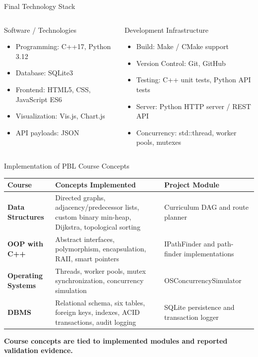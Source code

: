 \documentclass[aspectratio=169,11pt]{beamer}
\begin{document}
\begin{frame}{Final Technology Stack}
\begin{columns}[T,totalwidth=\textwidth]
\begin{block}{Software / Technologies}
\begin{itemize}\itemsep2pt
\item Programming: C++17, Python 3.12
\item Database: SQLite3
\item Frontend: HTML5, CSS, JavaScript ES6
\item Visualization: Vis.js, Chart.js
\item API payloads: JSON
\end{itemize}
\end{block}
\begin{block}{Development Infrastructure}
\begin{itemize}\itemsep2pt
\item Build: Make / CMake support
\item Version Control: Git, GitHub
\item Testing: C++ unit tests, Python API tests
\item Server: Python HTTP server / REST API
\item Concurrency: std::thread, worker pools, mutexes
\end{itemize}
\end{block}
\end{columns}
\end{frame}

\begin{frame}{Implementation of PBL Course Concepts}
\scriptsize
\begin{center}
\renewcommand{\arraystretch}{1.25}
\begin{tabularx}{.96\textwidth}{@{}>{\bfseries\RaggedRight}p{2.3cm} >{\RaggedRight\arraybackslash}X >{\RaggedRight}p{2.6cm}@{}}
\toprule
Course & Concepts Implemented & Project Module\\
\midrule
Data Structures & Directed graphs, adjacency/predecessor lists, custom binary min-heap, Dijkstra, topological sorting & Curriculum DAG and route planner\\
OOP with C++ & Abstract interfaces, polymorphism, encapsulation, RAII, smart pointers & IPathFinder and path-finder implementations\\
Operating Systems & Threads, worker pools, mutex synchronization, concurrency simulation & OSConcurrencySimulator\\
DBMS & Relational schema, six tables, foreign keys, indexes, ACID transactions, audit logging & SQLite persistence and transaction logger\\
\bottomrule
\end{tabularx}
\end{center}
\vfill
\begin{center}
\colorbox{GEULightBlue}{\parbox{.9\textwidth}{\centering\textbf{Course concepts are tied to implemented modules and reported validation evidence.}}}
\end{center}
\end{frame}
\end{document}
